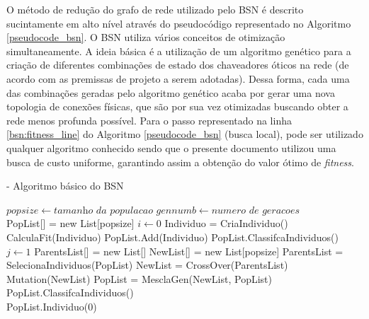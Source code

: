 \documentclass[12pt]{article}
\begin{document}
O método de redução do grafo de rede utilizado pelo BSN é descrito sucintamente em alto nível através do pseudocódigo representado no Algoritmo \ref{pseudocode_bsn}. O BSN utiliza vários conceitos de otimização simultaneamente. A ideia básica é a utilização de um algoritmo genético para a criação de diferentes combinações de estado dos chaveadores óticos na rede (de acordo com as premissas de projeto a serem adotadas). Dessa forma, cada uma das combinações geradas pelo algoritmo genético acaba por gerar uma nova topologia de conexões físicas, que são por sua vez otimizadas buscando obter a rede menos profunda possível. Para o passo representado na linha \ref{bsn:fitness_line} do Algoritmo \ref{pseudocode_bsn} (busca local), pode ser utilizado qualquer algoritmo conhecido sendo que o presente documento utilizou uma busca de custo uniforme, garantindo assim a obtenção do valor ótimo de \emph{fitness}.

\begin{algorithm} [h]
\caption{ - Algoritmo básico do BSN}
\begin{algorithmic}[1]
\State $popsize\gets \textit{tamanho da populacao}$
\State $gennumb\gets \textit{numero de geracoes}$\\
\State PopList[] = new List[popsize]
\State $i\gets 0$
\State Individuo = CriaIndividuo()
\State CalculaFit(Individuo)\label{bsn:fitness_line}
\State PopList.Add(Individuo)
\State PopList.ClassifcaIndividuos()
\EndWhile{}\\
\State $j\gets 1$
\State ParentsList[] = new List[]
\State NewList[] = new List[popsize]
\State ParentsList = SelecionaIndividuos(PopList)
\State NewList = CrossOver(ParentsList)
\State Mutation(NewList)
\State PopList = MesclaGen(NewList, PopList)
\State PopList.ClassifcaIndividuos()
\EndWhile\\
\State\Return PopList.Individuo(0)
\end{algorithmic}
\label{pseudocode_bsn}
\end{algorithm}
\end{document}
